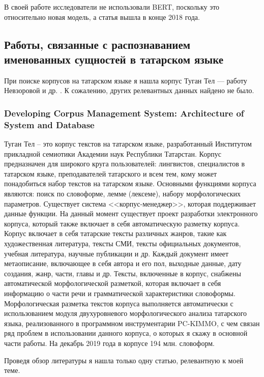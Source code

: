 В своей работе исследователи не использовали BERT, поскольку это относительно новая модель, а статья вышла в конце 2018 года.


\subsection{Работы, связанные с распознаванием именованных сущностей в татарском языке}

При поиске корпусов на татарском языке я нашла корпус Туган Тел --- работу Невзоровой и др. \cite{tugan_tel}. К сожалению, других релевантных данных найдено не было.

\subsubsection{Developing Corpus Management System:
Architecture of System and Database}

Туган Тел -- это корпус текстов на татарском языке, разработанный Институтом прикладной
семиотики Академии наук Республики Татарстан. Корпус предназначен для широкого круга 
пользователей: лингвистов, специалистов в татарском языке, преподавателей татарского и всем 
тем, кому может понадобиться набор текстов на татарском языке. Основными функциями корпуса 
являются: поиск  по словоформе, лемме (лексеме), набору морфологических параметров. 
Существует система <<корпус-менеджер>>, которая поддерживает данные функции.  На данный 
момент существует проект разработки электронного корпуса, который также включает в себя 
автоматическую разметку корпуса. Корпус включает в  себя татарские тексты различных жанров, такие как художественная литература, тексты СМИ, тексты официальных документов, учебная литература, научные публикации и др. Каждый документ имеет метаописание, включающее в себя автора и его пол, выходные данные, дату  создания, жанр, части, главы и др. Тексты, включенные в корпус, снабжены автоматической  морфологической разметкой, которая включает в себя информацию о части речи и 
грамматической характеристики словоформы. Морфологическая разметка текстов корпуса 
выполняется автоматически с использованием модуля двухуровневого морфологического анализа 
татарского языка, реализованного в программном инструментарии PC-KIMMO, с чем связан ряд 
проблем в использовании данного корпуса, о которых я скажу в основной части работы. На 
декабрь 2019 года в корпусе 194 млн. словоформ. 




Проведя обзор литературы я нашла только одну статью, релевантную к моей теме.

